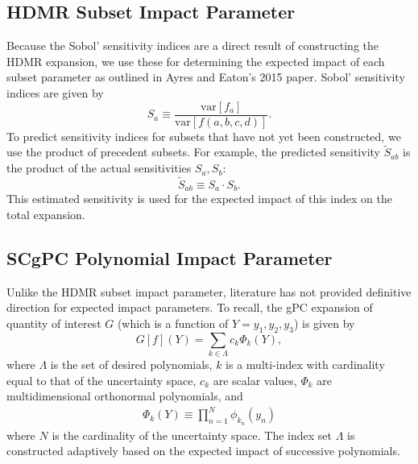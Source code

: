 \documentclass[11pt]{article}
\begin{document}
\subsection{HDMR Subset Impact Parameter}
Because the Sobol' sensitivity indices are a direct result of constructing the HDMR expansion, we use these for determining the expected impact of each subset parameter as outlined in Ayres and Eaton's 2015 paper.  Sobol' sensitivity indices are given by
\begin{equation}
S_a \equiv \frac{\text{var}[f_a]}{\text{var}[f(a,b,c,d)]}.
\end{equation}
To predict sensitivity indices for subsets that have not yet been constructed, we use the product of precedent subsets.  For example, the predicted sensitivity $\tilde S_{ab}$ is the product of the actual sensitivities $S_a,S_b$:
\begin{equation}
\tilde S_{ab} \equiv S_a \cdot S_b.
\end{equation}
This estimated sensitivity is used for the expected impact of this index on the total expansion.

\subsection{SCgPC Polynomial Impact Parameter}
Unlike the HDMR subset impact parameter, literature has not provided definitive direction for expected impact parameters.  To recall, the gPC expansion of quantity of interest $G$ (which is a function of $Y=y_1,y_2,y_3$) is given by
\begin{equation}
  G[f](Y) = \sum_{k\in\Lambda} c_k \Phi_k(Y),
\end{equation}
where $\Lambda$ is the set of desired polynomials, $k$ is a multi-index with cardinality equal to that of the uncertainty space, $c_k$ are scalar values, $\Phi_k$ are multidimensional orthonormal polynomials, and
\begin{align}
\Phi_k(Y) \equiv \prod_{n=1}^N \phi_{k_n}(y_n)
\end{align}
where $N$ is the cardinality of the uncertainty space.  The index set $\Lambda$ is constructed adaptively based on the expected impact of successive polynomials.\\
\end{document}
